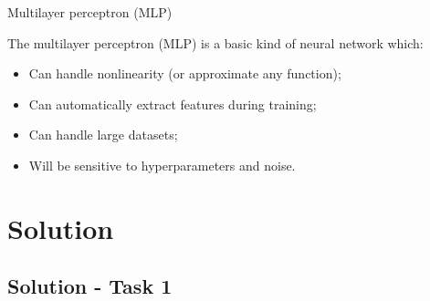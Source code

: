 \documentclass{beamer}
\begin{document}
\begin{frame}{Multilayer perceptron (MLP)}

  The multilayer perceptron (MLP) is a basic kind of neural network which: \vspace{.25cm}

  \begin{itemize}
    \item Can handle nonlinearity (or approximate any function); \vspace{.25cm}
    \item Can automatically extract features during training; \vspace{.25cm}
    \item Can handle large datasets; \vspace{.25cm}
    \item Will be sensitive to hyperparameters and noise. \vspace{.25cm}
  \end{itemize}

\end{frame}

\section{Solution}

\subsection{Solution - Task 1}
\end{document}
